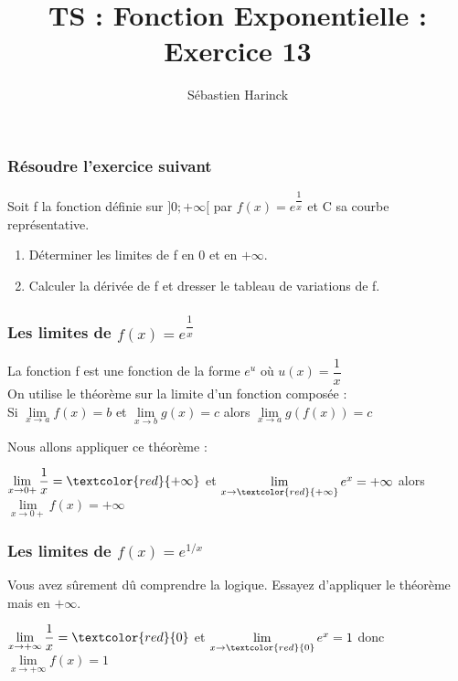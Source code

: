 \documentclass[t]{beamer}
\title{TS : Fonction Exponentielle : Exercice 13}
\author{Sébastien Harinck}
\institute{www.cours-futes.com}
\date{}
\begin{document}
\begin{frame}
\titlepage
\end{frame}

\begin{frame}
\frametitle{Résoudre l'exercice suivant}
Soit f la fonction définie sur $ ]0; + \infty [$ par $f(x)= e^{\dfrac{1}{x}} $ 
\pause
et C sa courbe représentative.
\begin{enumerate}
\item<+-> Déterminer les limites de f en 0 et en $ + \infty $.
\item<+-> Calculer la dérivée de f et dresser le tableau de variations de f.
\end{enumerate} 
\end{frame}

\begin{frame}
\frametitle{Les limites de $f(x)= e^{\dfrac{1}{x}} $ }
La fonction f est une fonction de la forme $e^u$ où
\( u(x) = \dfrac{1}{x} \)
\pause
\\

On utilise le théorème sur la limite d'un fonction composée :
\\
\pause
Si
\( \lim\limits_{x \rightarrow a} f(x) = b \)
et 
\( \lim\limits_{x \rightarrow b} g(x) = c \)
alors 
\( \lim\limits_{x \rightarrow a} g(f(x)) = c \)

\pause
Nous allons appliquer ce théorème :
\pause

\( \lim\limits_{x \rightarrow 0+} \dfrac{1}{x} = \textcolor{red}{+ \infty} \)
et
\( \lim\limits_{x \rightarrow \textcolor{red}{+\infty}} e^x = + \infty \)
alors
\( \lim\limits_{x \rightarrow 0+} f(x) = + \infty \)
\end{frame}

\begin{frame}
\frametitle{Les limites de $f(x)= e^{1/x} $ }
\pause
Vous avez sûrement dû comprendre la logique.
\pause
Essayez d'appliquer le théorème mais en $ + \infty $.
\pause

\( \lim\limits_{x \rightarrow + \infty} \dfrac{1}{x} = \textcolor{red}{0} \)
et
\pause
\( \lim\limits_{x \rightarrow \textcolor{red}{0}} e^x = 1 \)
donc
\pause
\( \lim\limits_{x \rightarrow + \infty} f(x) = 1\)
\end{frame}
\end{document}
